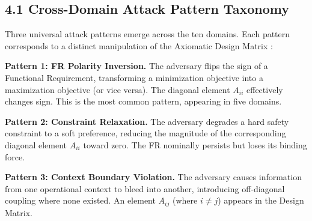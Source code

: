 \documentclass[
]{article}
\newcounter{none} %
\begin{document}
\subsection{4.1 Cross-Domain Attack Pattern
Taxonomy}\label{sec:attack_patterns}

Three universal attack patterns emerge across the ten domains. Each
pattern corresponds to a distinct manipulation of the Axiomatic Design
Matrix \cite{suh2001axiomatic}:

\textbf{Pattern 1: FR Polarity Inversion.} The adversary flips the sign
of a Functional Requirement, transforming a minimization objective into
a maximization objective (or vice versa). The diagonal element
\(A_{ii}\) effectively changes sign. This is the most common pattern,
appearing in five domains.

\textbf{Pattern 2: Constraint Relaxation.} The adversary degrades a hard
safety constraint to a soft preference, reducing the magnitude of the
corresponding diagonal element \(A_{ii}\) toward zero. The FR nominally
persists but loses its binding force.

\textbf{Pattern 3: Context Boundary Violation.} The adversary causes
information from one operational context to bleed into another,
introducing off-diagonal coupling where none existed. An element
\(A_{ij}\) (where \(i \neq j\)) appears in the Design Matrix.
\end{document}
